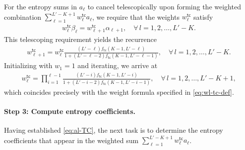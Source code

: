 \documentclass[english]{article}
\newcommand{\tc}{\mathsf{tc}}
\begin{document}
For the entropy sums in $a_\ell$ to cancel telescopically upon forming the weighted combination $\sum_{\ell = 1}^{L'-K+1} w^\tc_{\ell} a_\ell$, we require that the weights $w^\tc_{\ell}$ satisfy
\begin{align*}
w^\tc_{\ell} \beta_{\ell} = w^\tc_{\ell + 1} \alpha_{\ell + 1}, \quad \forall\, l = 1, 2, \ldots, L'-K.
\end{align*}
This telescoping requirement yields the recurrence
\begin{align}
w^\tc_{\ell + 1} = w^\tc_{\ell} \frac{(L'-\ell)  f_\tc(K-1, L'-\ell)}{1 + (L' - \ell - 2)  f_\tc(K - 1, L' - \ell - 1)}, \quad \forall\,l = 1, 2, \ldots, L'-K.
\end{align}
Initializing with $ w_1 = 1 $ and iterating, we arrive at
\begin{align}\label{eq:wl-TC}
w^\tc_{\ell} = \prod_{i=1}^{\ell - 1} \frac{(L'-i)f_\tc(K-1, L' - i)}{1 + (L'-i-2)f_\tc(K-1, L' - i - 1)},\quad \forall\,l = 1,2,\ldots, L'-K+1, 
\end{align}
which coincides precisely with the weight formula specified in \eqref{eq:wl-tc-def}.

\paragraph{Step 3: Compute entropy coefficients.}

Having established \eqref{eq:al-TC}, the next task is to determine the entropy coefficients that appear in the weighted sum $ \sum_{\ell = 1}^{L'-K+1} w^\tc_{\ell} a_\ell $.
\end{document}
